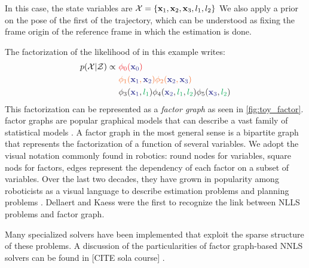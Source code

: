 In this case, the state variables are $\mathcal{X} = \{ {\bf x}_1, {\bf x}_2, {\bf x}_3, l_1, l_2\}$ %
We also apply a prior on the pose of the first \keyframe of the trajectory, which can be understood as fixing the frame origin of the reference 
frame in which the estimation is done.

The factorization of the likelihood of  in this example writes:
%
\begin{align}
    p(\mathcal{X} | \mathcal{Z}) \propto 
    ~&{\color{Red} \phi_0({\color{Blue} \bfx_{0}})} \\ 
    ~&{\color{Orange} \phi_1({\color{Blue} \bfx_1}, {\color{Blue} \bfx_2}) \phi_2({\color{Blue} \bfx_2}, {\color{Blue} \bfx_3})} \\ 
    ~&{\color{Black} \phi_3({\color{Blue} \bfx_1}, {\color{Green} l_1}) \phi_4({\color{Blue} \bfx_2}, {\color{Green} l_1}, {\color{Green} l_2}) \phi_5({\color{Blue} \bfx_3}, {\color{Green} l_2})} \\ 
\end{align}
%
This factorization can be represented as a \textit{factor graph} as seen in \ref{fig:toy_factor}. 
factor graphs are popular graphical models \cite{koller2009probabilistic} that can describe a vast family of statistical models \cite{loeliger2004introduction}.
A factor graph in the most general sense is a bipartite graph that represents the factorization of a function of several variables. 
We adopt the visual notation commonly found in robotics: round nodes for variables, square nods for factors, edges represent the dependency 
of each factor on a subset of variables. Over the last two decades, they have grown in popularity among roboticists as a visual language to describe 
estimation problems \cite{dellaert2017factor} and planning problems \cite{dong2016motion}. Dellaert and Kaess \cite{dellaert2006square} were the first to
recognize the link between NLLS problems and factor graph.

Many specialized solvers \cite{grisetti2011g2o, dellaert2012factor, ila2017slam++} have been implemented that exploit the sparse structure of these 
problems. A discussion of the particularities of factor graph-based NNLS solvers can be found in [CITE sola course] \cite{dellaert2017factor}.


